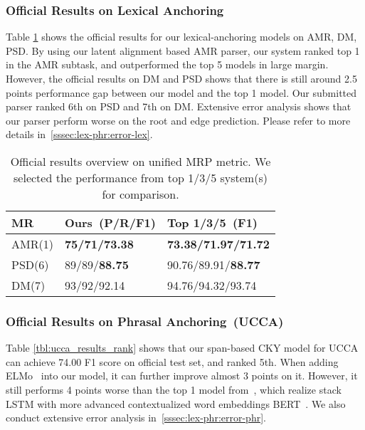 \subsubsection{Official Results on Lexical Anchoring}
\label{sssec:lex-phr:lex-results}
Table \ref{tbl:results_rank} shows the official results for our
lexical-anchoring models on AMR, DM, PSD.  By using our latent
alignment based AMR parser, our system ranked top 1 in the AMR
subtask, and outperformed the top 5 models in large margin. However,
the official results on DM and PSD shows that there is still around
2.5 points performance gap between our model and the top 1 model. Our
submitted parser ranked 6th on PSD and 7th on DM. Extensive error
analysis shows that our parser perform worse on the root and edge
prediction. Please refer to more details
in~\autoref{sssec:lex-phr:error-lex}.

\begin{table}[!tbp]
\caption{\label{tbl:results_rank} Official results overview on unified MRP metric. We selected the performance from top 1/3/5 system(s) for comparison.}
\begin{center}
\begin{tabular}{lll}
\toprule
\hline
MR     & Ours~(P/R/F1) & Top 1/3/5~(F1)  \\ \hline
AMR(1) & {\bf 75/71/73.38}   & {\bf 73.38/71.97/71.72} \\
PSD(6) & 89/89/{\bf 88.75}   & 90.76/89.91/{\bf 88.77} \\
DM(7)  & 93/92/92.14   & 94.76/94.32/93.74 \\ \hline
\bottomrule
\end{tabular}
\end{center}
\end{table}

\subsubsection{Official Results on Phrasal Anchoring~(UCCA)}
\label{sssec:lex-phr:ucca-results}
Table \ref{tbl:ucca_results_rank} shows that our span-based CKY model
for UCCA can achieve 74.00 F1 score on official test set, and ranked
5th. When adding ELMo~\cite{Peters:2018} into our model, it can
further improve almost 3 points on it. However, it still performs 4
points worse than the top 1 model from~\cite{Che:Dou:Xu:19}, which
realize stack LSTM with more advanced contextualized word embeddings
BERT~\cite{devlin2019bert}. We also conduct extensive error analysis
in~\autoref{sssec:lex-phr:error-phr}.

